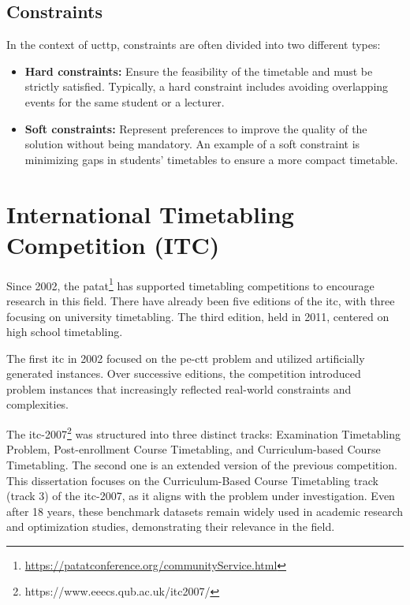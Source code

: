 \subsection{Constraints}
In the context of \ac{ucttp}, constraints are often divided into two different types:
\begin{itemize}
\item \textbf{Hard constraints:} Ensure the feasibility of the timetable and must be strictly satisfied. Typically, a hard constraint includes avoiding overlapping events for the same student or a lecturer. 
\item \textbf{Soft constraints:} Represent preferences to improve the quality of the solution without being mandatory. An example of a soft constraint is minimizing gaps in students' timetables to ensure a more compact timetable.
\end{itemize}

\section{International Timetabling Competition (ITC)}

Since 2002, the \ac{patat}\footnote{\url{https://patatconference.org/communityService.html}} has supported timetabling competitions to encourage research in this field. There have already been five editions of the \ac{itc}, with three focusing on university timetabling. The third edition, held in 2011, centered on high school timetabling.

The first \ac{itc} in 2002 focused on the \ac{pe-ctt} problem and utilized artificially generated instances. Over successive editions, the competition introduced problem instances that increasingly reflected real-world constraints and complexities.

The \ac{itc-2007}\footnote{https://www.eeecs.qub.ac.uk/itc2007/} was structured into three distinct tracks: Examination Timetabling Problem, Post-enrollment Course Timetabling, and Curriculum-based Course Timetabling. The second one is an extended version of the previous competition. This dissertation focuses on the Curriculum-Based Course Timetabling track (track 3) of the \ac{itc-2007}, as it aligns with the problem under investigation. Even after 18 years, these benchmark datasets remain widely used in academic research and optimization studies, demonstrating their relevance in the field.

